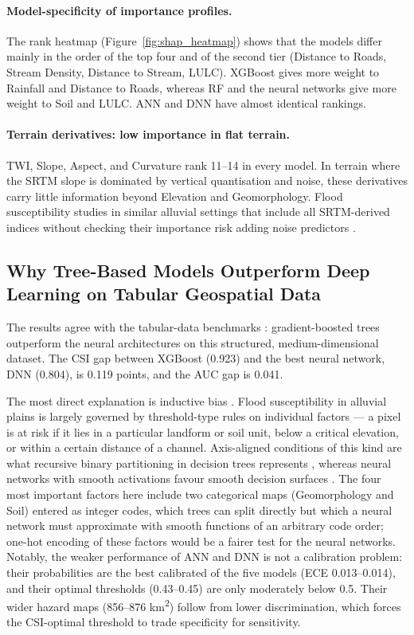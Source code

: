 \documentclass[12pt, a4paper]{article}
\begin{document}
\paragraph{Model-specificity of importance profiles.}
The rank heatmap (Figure~\ref{fig:shap_heatmap}) shows that the models differ mainly in the order of the top four and of the second tier (Distance to Roads, Stream Density, Distance to Stream, LULC). XGBoost gives more weight to Rainfall and Distance to Roads, whereas RF and the neural networks give more weight to Soil and LULC. ANN and DNN have almost identical rankings.

\paragraph{Terrain derivatives: low importance in flat terrain.}
TWI, Slope, Aspect, and Curvature rank 11--14 in every model. In terrain where the SRTM slope is dominated by vertical quantisation and noise, these derivatives carry little information beyond Elevation and Geomorphology. Flood susceptibility studies in similar alluvial settings that include all SRTM-derived indices without checking their importance risk adding noise predictors \citep{tehrany2019, khosravi2018}.

\subsection{Why Tree-Based Models Outperform Deep Learning on Tabular Geospatial Data}

The results agree with the tabular-data benchmarks \citep{grinsztajn2022, shwartzziv2022, mcelfresh2023}: gradient-boosted trees outperform the neural architectures on this structured, medium-dimensional dataset. The CSI gap between XGBoost (0.923) and the best neural network, DNN (0.804), is 0.119 points, and the AUC gap is 0.041.

The most direct explanation is inductive bias \citep{Mitchell1980}. Flood susceptibility in alluvial plains is largely governed by threshold-type rules on individual factors --- a pixel is at risk if it lies in a particular landform or soil unit, below a critical elevation, or within a certain distance of a channel. Axis-aligned conditions of this kind are what recursive binary partitioning in decision trees represents \citep{breiman2001}, whereas neural networks with smooth activations favour smooth decision surfaces \citep{Popov2021}. The four most important factors here include two categorical maps (Geomorphology and Soil) entered as integer codes, which trees can split directly but which a neural network must approximate with smooth functions of an arbitrary code order; one-hot encoding of these factors would be a fairer test for the neural networks. Notably, the weaker performance of ANN and DNN is not a calibration problem: their probabilities are the best calibrated of the five models (ECE 0.013--0.014), and their optimal thresholds (0.43--0.45) are only moderately below 0.5. Their wider hazard maps (856--876 km\textsuperscript{2}) follow from lower discrimination, which forces the CSI-optimal threshold to trade specificity for sensitivity.
\end{document}
